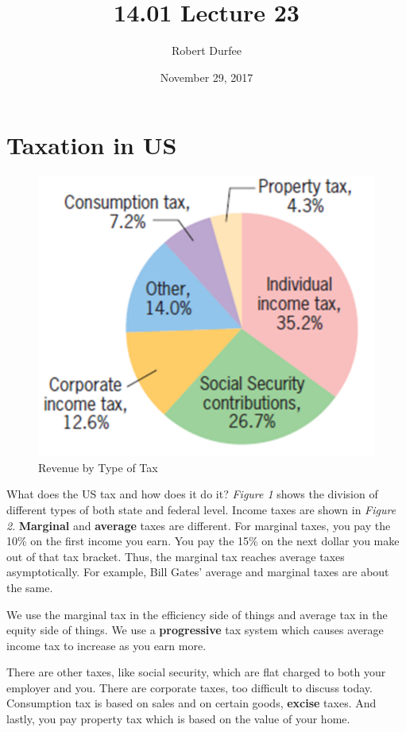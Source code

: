 \documentclass{article}
\title{ 14.01 Lecture 23 }
\author{ Robert Durfee }
\date{ November 29, 2017 }
\begin{document}
\maketitle

\section{ Taxation in US }

\begin{figure}[H]
    \centering
    \includegraphics[scale=0.30]{"Revenue by Type of Tax"}
    \caption{Revenue by Type of Tax}
\end{figure}

What does the US tax and how does it do it? \textit{Figure 1} shows the division
of different types of both state and federal level. Income taxes are shown in
\textit{Figure 2}. \textbf{Marginal} and \textbf{average} taxes are different.
For marginal taxes, you pay the 10\% on the first income you earn. You pay the
15\% on the next dollar you make out of that tax bracket. Thus, the marginal tax
reaches average taxes asymptotically. For example, Bill Gates' average and
marginal taxes are about the same. 

We use the marginal tax in the efficiency side of things and average tax in the
equity side of things. We use a \textbf{progressive} tax system which causes
average income tax to increase as you earn more.

There are other taxes, like social security, which are flat charged to both your
employer and you. There are corporate taxes, too difficult to discuss today.
Consumption tax is based on sales and on certain goods, \textbf{excise} taxes.
And lastly, you pay property tax which is based on the value of your home. 
\end{document}

